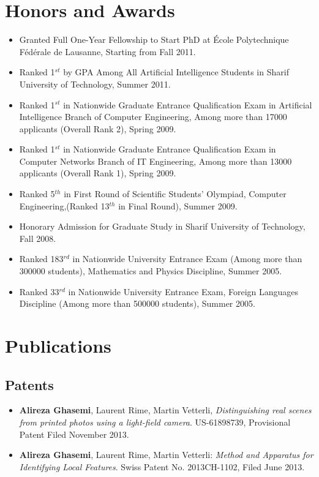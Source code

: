 \documentclass[a4paper]{article}
\theoremstyle{definition}
\begin{document}
\section{Honors and Awards}
\begin{itemize}
\item Granted Full One-Year Fellowship to Start PhD at  \'{E}cole Polytechnique F\'{e}d\'{e}rale de Lausanne, Starting from Fall 2011.
\item Ranked 1$^{st}$ by GPA Among All Artificial Intelligence Students in Sharif University of Technology, Summer 2011.
\item Ranked 1$^{st}$ in Nationwide Graduate Entrance Qualification Exam in Artificial Intelligence Branch of Computer Engineering, Among more than 17000 applicants (Overall Rank 2), Spring 2009.
\item Ranked 1$^{st}$ in Nationwide Graduate Entrance Qualification Exam in Computer Networks  Branch of IT Engineering, Among more than 13000 applicants (Overall Rank 1), Spring 2009.

\item Ranked 5$^{th}$ in First Round of Scientific Students' Olympiad, Computer Engineering,(Ranked 13$^{th}$ in Final Round), Summer 2009.
\item Honorary Admission for Graduate Study in Sharif University of Technology, Fall 2008.
\item Ranked 183$^{rd}$ in Nationwide University Entrance Exam (Among more than 300000 students), Mathematics and Physics Discipline, Summer 2005.
\item Ranked 33$^{rd}$ in Nationwide University Entrance Exam, Foreign Languages Discipline (Among more than 500000 students), Summer 2005.
\end{itemize}
\section{Publications}
\subsection{Patents}
\begin{itemize}

\item \textbf{Alireza Ghasemi}, Laurent Rime, Martin Vetterli, \textit{Distinguishing real scenes from printed photos using a light-field camera}. US-61898739, Provisional Patent Filed November 2013.
\item \textbf{Alireza Ghasemi}, Laurent Rime, Martin Vetterli:\textit{ Method and Apparatus for Identifying Local Features}. Swiss Patent No. 2013CH-1102, Filed June 2013. 
\end{itemize}
\end{document}
